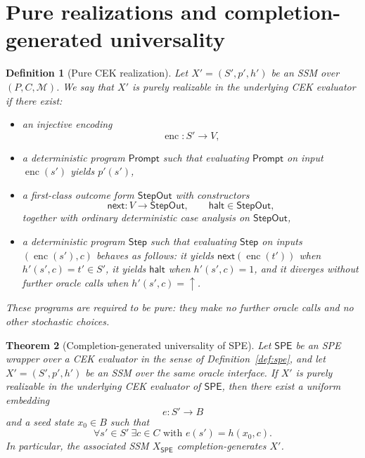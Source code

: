 \documentclass[11pt]{article}
\newtheorem{definition}{Definition}[section]
\newtheorem{theorem}[definition]{Theorem}
\newcommand{\SPE}{\mathsf{SPE}}
\newcommand{\enc}{\operatorname{enc}}
\begin{document}
\section{Pure realizations and completion-generated universality}

\begin{definition}[Pure CEK realization]
Let $X'=(S',p',h')$ be an SSM over $(P,C,\mathcal{M})$. We say that $X'$ is \emph{purely realizable in the underlying CEK evaluator} if there exist:
\begin{itemize}
    \item an injective encoding
    \[
    \enc:S'\to V,
    \]
    \item a deterministic program $\mathsf{Prompt}$ such that evaluating $\mathsf{Prompt}$ on input $\enc(s')$ yields $p'(s')$,
    \item a first-class outcome form $\mathsf{StepOut}$ with constructors
    \[
    \mathsf{next}:V\to \mathsf{StepOut},
    \qquad
    \mathsf{halt}\in \mathsf{StepOut},
    \]
    together with ordinary deterministic case analysis on $\mathsf{StepOut}$,
    \item a deterministic program $\mathsf{Step}$ such that evaluating $\mathsf{Step}$ on inputs $(\enc(s'),c)$ behaves as follows: it yields $\mathsf{next}(\enc(t'))$ when $h'(s',c)=t'\in S'$, it yields $\mathsf{halt}$ when $h'(s',c)=1$, and it diverges without further oracle calls when $h'(s',c)=\uparrow$.
\end{itemize}
These programs are required to be \emph{pure}: they make no further oracle calls and no other stochastic choices.
\end{definition}

\begin{theorem}[Completion-generated universality of SPE]\label{thm:main}
Let $\SPE$ be an SPE wrapper over a CEK evaluator in the sense of Definition~\ref{def:spe}, and let $X'=(S',p',h')$ be an SSM over the same oracle interface. If $X'$ is purely realizable in the underlying CEK evaluator of $\SPE$, then there exist a uniform embedding
\[
e:S'\to B
\]
and a seed state $x_0\in B$ such that
\[
\forall s'\in S'\ \exists c\in C\text{ with } e(s')=h(x_0,c).
\]
In particular, the associated SSM $X_{\SPE}$ completion-generates $X'$.
\end{theorem}
\end{document}
